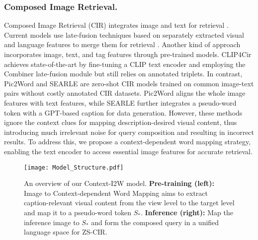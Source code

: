 \documentclass[letterpaper]{article} \usepackage{aaai24}  \usepackage{times}  \usepackage{helvet}  \usepackage{courier}  \usepackage[hyphens]{url}  \usepackage{graphicx} \urlstyle{rm} \def\UrlFont{\rm}  \usepackage{natbib}  \usepackage{caption} \frenchspacing  \setlength{\pdfpagewidth}{8.5in} \setlength{\pdfpageheight}{11in} \usepackage{algorithm}
\begin{document}
\subsubsection{Composed Image Retrieval.} Composed Image Retrieval (CIR) integrates image and text for retrieval \cite{Vo_2019_CVPR}. Current models use late-fusion techniques based on separately extracted visual and language features to merge them for retrieval \cite{Baldrati_2022_CVPR, Liu_2021_ICCV, Chen_2020_CVPR}. Another kind of approach \cite{Goenka_2022_CVPR, 10.1007/978-3-031-19833-5_37} incorporates image, text, and tag features through pre-trained models.  CLIP4Cir \cite{Baldrati_2022_CVPR} achieves state-of-the-art by fine-tuning a CLIP \cite{radford2021learning} text encoder and employing the Combiner late-fusion module but still relies on annotated triplets. In contrast, Pic2Word \cite{Saito_2023_CVPR} and SEARLE \cite{baldrati2023zero} are zero-shot CIR models trained on common image-text pairs without costly annotated CIR datasets. Pic2Word aligns the whole image features with text features, while SEARLE further integrates a pseudo-word token with a GPT-based \cite{brown2020language} caption for data generation. However, these methods ignore the context clues for mapping description-desired visual content, thus introducing much irrelevant noise for query composition and resulting in incorrect results. To address this, we propose a context-dependent word mapping strategy, enabling the text encoder to access essential image features for accurate retrieval.


\begin{figure*}
    \centering
\texttt{[image: Model\_Structure.pdf]}   
    \caption{An overview of our Context-I2W model. \textbf{Pre-training (left):} Image to Context-dependent Word Mapping aims to extract caption-relevant visual content from the view level to the target level and map it to a pseudo-word token $S_*$. \textbf{Inference (right):} Map the inference image to $S_*$ and form the composed query in a unified language space for ZS-CIR.}
 \vspace{-10pt}
    \label{fig:model-architecture}
\end{figure*}
\end{document}
